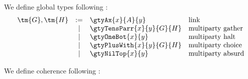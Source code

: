 \documentclass{article}
\begin{document}
\begin{definition}\label{def:globaltypes}
  We define global types following \textcite{carbone2016}:
  \begin{gather*}
    \begin{array}{lcll}
      \tm{G}, \tm{H}
      & :=   & \gtyAx{x}{A}{y}                                         & \text{link} \\
      & \mid & \gtyTensParr{x}{y}{G}{H}                                & \text{multiparty gather} \\
      & \mid & \gtyOneBot{x}{y}                                        & \text{multiparty halt} \\
      & \mid & \gtyPlusWith{x}{y}{G}{H}                                & \text{multiparty choice} \\
      & \mid & \gtyNilTop{x}{y}                                        & \text{multiparty absurd}
    \end{array}
  \end{gather*}
\end{definition}

\begin{definition}[Coherence]\label{def:globaltypes-coherence}
  We define coherence following \textcite{carbone2016}:
  \begin{center} \gcpInfAx                     \end{center}\vspace{1\baselineskip}
  \begin{center} \gcpInfTensParr \gcpInfOneBot \end{center}
\end{definition}


\printbibliography
\end{document}
